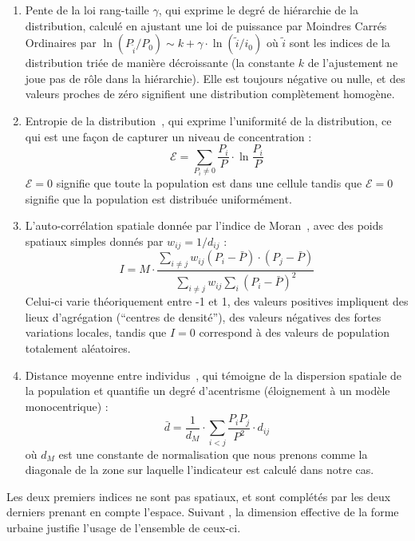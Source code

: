 {\begin{enumerate}
\item Pente de la loi rang-taille $\gamma$, qui exprime le degré de hiérarchie de la distribution, calculé en ajustant une loi de puissance par Moindres Carrés Ordinaires par $\ln \left( P_{\tilde{i}}/P_0\right) \sim k + \gamma\cdot \ln \left(\tilde{i}/i_0\right)$ où $\tilde{i}$ sont les indices de la distribution triée de manière décroissante (la constante $k$ de l'ajustement ne joue pas de rôle dans la hiérarchie). Elle est toujours négative ou nulle, et des valeurs proches de zéro signifient une distribution complètement homogène. %
\item Entropie de la distribution~\cite{le2015forme}, qui exprime l'uniformité de la distribution, ce qui est une façon de capturer un niveau de concentration :
\begin{equation}
\mathcal{E} = \sum_{P_i\neq 0}\frac{P_i}{P}\cdot \ln{\frac{P_i}{P}}
\end{equation}
$\mathcal{E}=0$ signifie que toute la population est dans une cellule tandis que $\mathcal{E}=0$ signifie que la population est distribuée uniformément.
\item L'auto-corrélation spatiale donnée par l'indice de Moran~\cite{tsai2005quantifying}, avec des poids spatiaux simples donnés par $w_{ij} = 1/d_{ij}$ :
\[
I = M \cdot \frac{\sum_{i\neq j} w_{ij} \left(P_i - \bar{P}\right)\cdot\left(P_j - \bar{P}\right)}{\sum_{i\neq j} w_{ij} \sum_{i}{\left( P_i - \bar{P}\right)}^2}
\]
Celui-ci varie théoriquement entre -1 et 1, des valeurs positives impliquent des lieux d'agrégation (``centres de densité''), des valeurs négatives des fortes variations locales, tandis que $I=0$ correspond à des valeurs de population totalement aléatoires.
\item Distance moyenne entre individus~\cite{le2009quantifier}, qui témoigne de la dispersion spatiale de la population et quantifie un degré d'acentrisme (éloignement à un modèle monocentrique) :
\[
\bar{d} = \frac{1}{d_M}\cdot \sum_{i<j} \frac{P_i P_j}{P^2} \cdot d_{ij}
\]
où $d_M$ est une constante de normalisation que nous prenons comme la diagonale de la zone sur laquelle l'indicateur est calculé dans notre cas.
\end{enumerate}
}


Les deux premiers indices ne sont pas spatiaux, et sont complétés par les deux derniers prenant en compte l'espace. Suivant \cite{schwartz2011spatial}, la dimension effective de la forme urbaine justifie l'usage de l'ensemble de ceux-ci.

